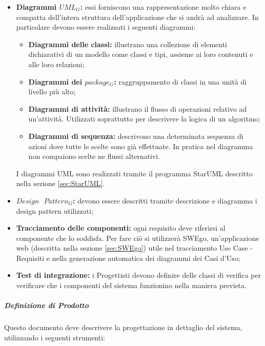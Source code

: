 				\begin{itemize}
					\item \textbf{Diagrammi $UML_G$:}
					essi forniscono una rappresentazione molto chiara e compatta dell'intera struttura dell'applicazione che si andrà ad analizzare. In particolare devono essere realizzati i seguenti diagrammi:
					\begin{itemize}
						\item \textbf{Diagrammi delle classi:} illustrano una collezione di elementi dichiarativi di un modello come classi e tipi, assieme ai loro contenuti e alle loro relazioni;
						\item \textbf{Diagrammi dei $package_G$:}  raggruppamento di classi in una unità di livello più alto;
						\item \textbf{Diagrammi di attività:} illustrano il flusso di operazioni relativo ad un'attività. Utilizzati soprattutto per descrivere la logica di un algoritmo;
						\item \textbf{Diagrammi di sequenza:} descrivono una determinata sequenza di azioni dove tutte le scelte sono già effettuate. In pratica nel diagramma non compaiono scelte ne flussi alternativi.
					\end{itemize}
				I diagrammi UML sono realizzati tramite il programma StarUML descritto nella sezione \ref{sec:StarUML}.
					\item \textbf{$Design\textbf{ }Pattern_G$:}
					devono essere descritti tramite descrizione e diagramma i design pattern utilizzati;
					\item \textbf{Tracciamento delle componenti:}
					ogni requisito deve riferirsi al componente che lo soddisfa. Per fare ciò si utilizzerà SWEgo, un'applicazione web (descritta nella sezione \ref{sec:SWEgo}) utile nel tracciamento Use Case - Requisiti e nella generazione automatica dei diagrammi dei Casi d'Uso;
					\item \textbf{Test di integrazione:}
					i Progettisti devono definire delle classi di verifica per verificare che i componenti del sistema funzionino nella maniera prevista.	
				\end{itemize}
			\subparagraph{Definizione di Prodotto}
			\Spazio
			Questo documento deve descrivere la progettazione in dettaglio del sistema, utilizzando i seguenti strumenti:
